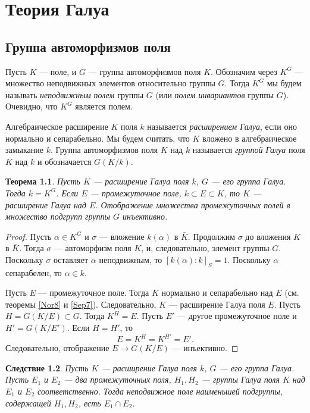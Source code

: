 \documentclass[12pt, titlepage, oneside]{amsbook}
\newtheorem{theorem}{Теорема}[chapter]
\newtheorem{corollary}[theorem]{Следствие}
\theoremstyle{definition}
\theoremstyle{remark}
\begin{document}
\chapter{Теория Галуа}

\section{Группа автоморфизмов поля}

Пусть $K$ --- поле, и $G$ --- группа автоморфизмов поля $K$. Обозначим через $K^G$ --- множество неподвижных элементов относительно группы $G$. Тогда $K^G$ мы будем называть \emph{неподвижным полем} группы $G$ (или \emph{полем инвариантов} группы $G$). Очевидно, что $K^G$ является полем.

Алгебраическое расширение $K$ поля $k$ называется \emph{расширением Галуа}, если оно нормально и сепарабельно. Мы будем считать, что $K$ вложено в алгебраическое замыкание $k$. Группа автоморфизмов поля $K$ над $k$ называется \emph{группой Галуа} поля $K$ над $k$ и обозначается $G(K/k)$.

\begin{theorem}
\label{Gal1}
Пусть $K$ --- расширение Галуа поля $k$, $G$ --- его группа Галуа. Тогда $k=K^G$. Если $E$ --- промежуточное поле, $k\subset E\subset K$, то $K$ --- расширение Галуа над $E$. Отображение множества промежуточных полей в множество подгрупп группы $G$ инъективно.
\end{theorem}

\begin{proof}
Пусть $\alpha\in K^G$ и $\sigma$ --- вложение $k(\alpha)$ в $\bar{K}$. Продолжим $\sigma$ до вложения $K$ в $\bar{K}$. Тогда $\sigma$ --- автоморфизм поля $K$, и, следовательно, элемент группы $G$. Поскольку $\sigma$ оставляет $\alpha$ неподвижным, то $[k(\alpha):k]_S=1$. Поскольку $\alpha$ сепарабелен, то $\alpha\in k$.

Пусть $E$ --- промежуточное поле. Тогда $K$ нормально и сепарабельно над $E$ (см. теоремы \ref{Nor8} и \ref{Sep7}). Следовательно, $K$ --- расширение Галуа поля $E$. Пусть $H=G(K/E)\subset G$. Тогда $K^H=E$. Пусть $E'$ --- другое промежуточное поле и $H'=G(K/E')$. Если $H=H'$, то $$E=K^H=K^{H'}=E'.$$ Следовательно, отображение $E\rightarrow G(K/E)$ --- инъективно.
\end{proof}

\begin{corollary}
\label{Gal2}
Пусть $K$ --- расширение Галуа поля $k$, $G$ --- его группа Галуа. Пусть $E_1$ и $E_2$ --- два промежуточных поля, $H_1,H_2$ --- группы Галуа поля $K$ над $E_1$ и $E_2$ соответственно. Тогда неподвижное поле наименьшей подгруппы, содержащей $H_1,H_2$, есть $E_1\cap E_2$.
\end{corollary}
\end{document}
